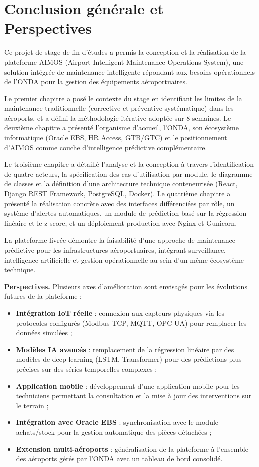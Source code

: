 \chapter*{Conclusion générale et Perspectives}

Ce projet de stage de fin d'études a permis la conception et la réalisation de la plateforme AIMOS (Airport Intelligent Maintenance Operations System), une solution intégrée de maintenance intelligente répondant aux besoins opérationnels de l'ONDA pour la gestion des équipements aéroportuaires.

Le premier chapitre a posé le contexte du stage en identifiant les limites de la maintenance traditionnelle (corrective et préventive systématique) dans les aéroports, et a défini la méthodologie itérative adoptée sur 8 semaines. Le deuxième chapitre a présenté l'organisme d'accueil, l'ONDA, son écosystème informatique (Oracle EBS, HR Access, GTB/GTC) et le positionnement d'AIMOS comme couche d'intelligence prédictive complémentaire.

Le troisième chapitre a détaillé l'analyse et la conception à travers l'identification de quatre acteurs, la spécification des cas d'utilisation par module, le diagramme de classes et la définition d'une architecture technique conteneurisée (React, Django REST Framework, PostgreSQL, Docker). Le quatrième chapitre a présenté la réalisation concrète avec des interfaces différenciées par rôle, un système d'alertes automatiques, un module de prédiction basé sur la régression linéaire et le z-score, et un déploiement production avec Nginx et Gunicorn.

La plateforme livrée démontre la faisabilité d'une approche de maintenance prédictive pour les infrastructures aéroportuaires, intégrant surveillance, intelligence artificielle et gestion opérationnelle au sein d'un même écosystème technique.

\vspace{0.3cm}
\noindent\textbf{Perspectives.} Plusieurs axes d'amélioration sont envisagés pour les évolutions futures de la plateforme :
\begin{itemize}
    \item \textbf{Intégration IoT réelle} : connexion aux capteurs physiques via les protocoles configurés (Modbus TCP, MQTT, OPC-UA) pour remplacer les données simulées ;
    \item \textbf{Modèles IA avancés} : remplacement de la régression linéaire par des modèles de deep learning (LSTM, Transformer) pour des prédictions plus précises sur des séries temporelles complexes ;
    \item \textbf{Application mobile} : développement d'une application mobile pour les techniciens permettant la consultation et la mise à jour des interventions sur le terrain ;
    \item \textbf{Intégration avec Oracle EBS} : synchronisation avec le module achats/stock pour la gestion automatique des pièces détachées ;
    \item \textbf{Extension multi-aéroports} : généralisation de la plateforme à l'ensemble des aéroports gérés par l'ONDA avec un tableau de bord consolidé.
\end{itemize}
